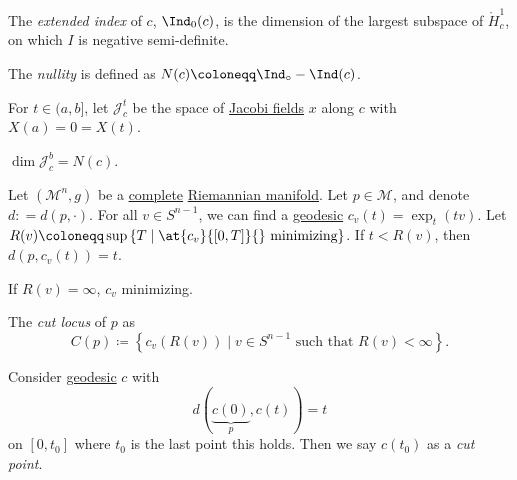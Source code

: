 \begin{definition}\label{def:exteded-index}
	The \emph{extended index} of \(c\), \(\Ind_0(c)\), is the dimension of the largest subspace of \(\mathring{H}_c^1\), on which \(I\) is negative semi-definite.
\end{definition}

\begin{definition}[Nullity]\label{def:nullity}
	The \emph{nullity} is defined as  \(N(c) \coloneqq \Ind_{\circ} - \Ind(c)\).
\end{definition}

For \(t\in (a, b]\), let \(\mathcal{J} ^t_c\) be the space of \hyperref[def:Jacobi-field]{Jacobi fields} \(x\) along \(c\) with \(X(a)= 0 = X(t)\).

\begin{lemma}
	\(\dim \mathcal{J} _c^b = N(c)\).
\end{lemma}

Let \((\mathcal{M}^n , g)\) be a \hyperref[def:geodesically-complete]{complete} \hyperref[def:Riemannian-manifold]{Riemannian manifold}. Let \(p\in \mathcal{M} \), and denote \(d\colon = d(p, \cdot)\). For all \(v\in S^{n-1}\), we can find a \hyperref[def:geodesic]{geodesic} \(c_v(t) = \exp _t(t v)\). Let \(R(v) \coloneqq \sup \left\{ T \mid \at{c_v}{[0, T]}{} \text{ minimizing}  \right\} \). If \(t < R(v)\), then \(d(p, c_v(t)) = t\).

\begin{eg}
	If \(R(v) = \infty \), \(c_v\) minimizing.
\end{eg}

\begin{definition}\label{def:cut-locus}
	The \emph{cut locus} of \(p\) as
	\[
		C(p) \coloneqq \left\{ c_v(R(v)) \mid v\in S^{n-1} \text{ such that } R(v) < \infty \right\}.
	\]
\end{definition}

\begin{definition}\label{def:cut-point}
	Consider \hyperref[def:geodesic]{geodesic} \(c\) with
	\[
		d(\underbrace{c(0)}_{p}, c(t)) = t
	\]
	on \([0, t_0]\) where \(t_0\) is the last point this holds. Then we say \(c(t_0)\) as a \emph{cut point}.
\end{definition}